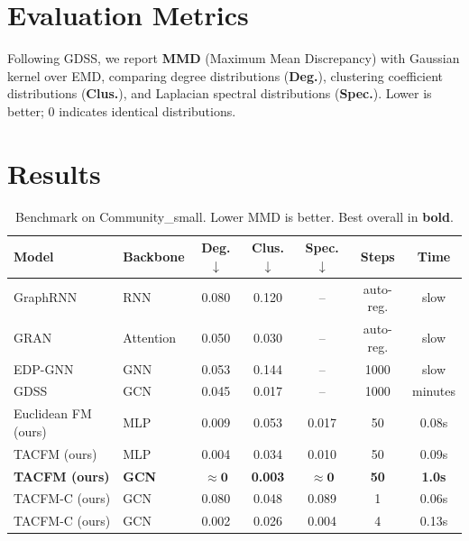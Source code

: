 \documentclass[10pt, twocolumn]{article}
\begin{document}
\section{Evaluation Metrics}

Following GDSS, we report \textbf{MMD} (Maximum Mean Discrepancy) with Gaussian kernel over EMD, comparing degree distributions (\textbf{Deg.}), clustering coefficient distributions (\textbf{Clus.}), and Laplacian spectral distributions (\textbf{Spec.}). Lower is better; 0 indicates identical distributions.

\section{Results}

\begin{table}[t]
\centering
\small
\caption{Benchmark on Community\_small. Lower MMD is better. Best overall in \textbf{bold}.}
\vspace{0.3em}
\begin{tabular}{llccccc}
\toprule
\textbf{Model} & \textbf{Backbone} & \textbf{Deg.}$\downarrow$ & \textbf{Clus.}$\downarrow$ & \textbf{Spec.}$\downarrow$ & \textbf{Steps} & \textbf{Time} \\
\midrule
GraphRNN & RNN & 0.080 & 0.120 & -- & auto-reg. & slow \\
GRAN & Attention & 0.050 & 0.030 & -- & auto-reg. & slow \\
EDP-GNN & GNN & 0.053 & 0.144 & -- & 1000 & slow \\
GDSS & GCN & 0.045 & 0.017 & -- & 1000 & minutes \\
\midrule
Euclidean FM (ours) & MLP & 0.009 & 0.053 & 0.017 & 50 & 0.08s \\
TACFM (ours) & MLP & 0.004 & 0.034 & 0.010 & 50 & 0.09s \\
\textbf{TACFM (ours)} & \textbf{GCN} & $\mathbf{\approx 0}$ & \textbf{0.003} & $\mathbf{\approx 0}$ & \textbf{50} & \textbf{1.0s} \\
\midrule
TACFM-C (ours) & GCN & 0.080 & 0.048 & 0.089 & 1 & 0.06s \\
TACFM-C (ours) & GCN & 0.002 & 0.026 & 0.004 & 4 & 0.13s \\
\bottomrule
\end{tabular}
\label{tab:results}
\end{table}
\end{document}
